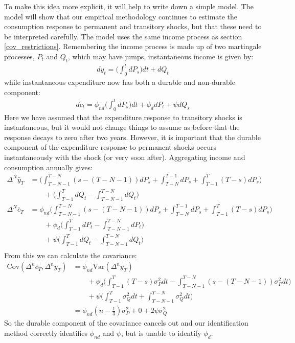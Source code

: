 \documentclass[titlepage]{\econtex}\newcommand{\texname}{ConsumptionHeterogeneity}
\begin{document}
To make this idea more explicit, it will help to write down a simple model. The model will show that our empirical methodology continues to estimate the consumption response to permanent and transitory shocks, but that these need to be interpreted carefully. The model uses the same income process as section \ref{cov_restrictions}. Remembering the income process is made up of two martingale processes, $P_t$ and $Q_t$, which may have jumps, instantaneous income is given by:
\begin{align*}
dy_t = \Big( \int_{0}^{t}dP_s \Big) dt  +dQ_t 
\end{align*}
while instantaneous expenditure now has both a durable and non-durable component:
\begin{align*}
dc_t = \phi_{nd} \Big( \int_{0}^{t} dP_s  \Big) dt + \phi_{d} dP_t + \psi dQ_s
\end{align*}
Here we have assumed that the expenditure response to transitory shocks is instantaneous, but it would not change things to assume as before that the response decays to zero after two years. However, it is important that the durable component of the expenditure response to permanent shocks occurs instantaneously with the shock (or very soon after). Aggregating income and consumption annually gives:
\begin{align*}
\Delta^N \bar{y}_T &=  \Big(\int_{T-N-1}^{T-N} (s-(T-N-1))dP_s  + \int_{T-N}^{T-1}dP_s + \int_{T-1}^{T} (T-s)dP_s \Big) \\
& \qquad + \Big(\int_{T-1}^{T} dQ_t -\int_{T-N-1}^{T-N} dQ_t \Big) \\
\Delta^N \bar{c}_T &= \phi_{nd} \Big(\int_{T-N-1}^{T-N} (s-(T-N-1))dP_s  + \int_{T-N}^{T-1}dP_s + \int_{T-1}^{T} (T-s)dP_s \Big) \\
& \qquad + \phi_d \Big(\int_{T-1}^{T} dP_t -\int_{T-N-1}^{T-N} dP_t \Big) \\
& \qquad + \psi \Big(\int_{T-1}^{T} dQ_t -\int_{T-N-1}^{T-N} dQ_t \Big) \\
\end{align*}
From this we can calculate the covariance:
\begin{align*}
\mathrm{Cov}(\Delta^n \bar{c_T},\Delta^n \bar{y_T} ) &= \phi_{nd} \mathrm{Var}(\Delta^n \bar{y_T}) \\
& \qquad + \phi_d \Bigg( \int_{T-1}^{T} (T-s) \sigma_P^2 dt - \int_{T-N-1}^{T-N}(s-(T-N-1)) \sigma_P^2 dt \Bigg) \\
& \qquad + \psi\Bigg(\int_{T-1}^{T}  \sigma_Q^2 dt + \int_{T-N-1}^{T-N}\sigma_Q^2 dt\Bigg) \\
&= \phi_{nd} (n-\frac{1}{3})\sigma_P^2 + 0 +  2 \psi \sigma_Q^2
\end{align*}
So the durable component of the covariance cancels out and our identification method correctly identifies $\phi_{nd}$ and $\psi$, but is unable to identify $\phi_d$.
\end{document}
